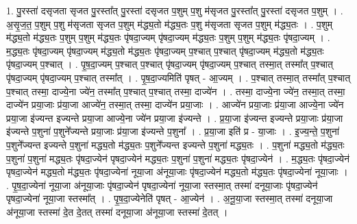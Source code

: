 \documentclass[17pt]{extarticle}
\begin{document}
1. पु॒रस्ता॑ दसृजता सृजत पु॒रस्ता᳚त् पु॒रस्ता॑ दसृजत प॒शुम् प॒शु म॑सृजत पु॒रस्ता᳚त् पु॒रस्ता॑ दसृजत प॒शुम् । . अ॒सृ॒ज॒त॒ प॒शुम् प॒शु म॑सृजता सृजत प॒शुम् म॑द्ध्य॒तो म॑द्ध्य॒तः प॒शु म॑सृजता सृजत प॒शुम् म॑द्ध्य॒तः । . प॒शुम् म॑द्ध्य॒तो म॑द्ध्य॒तः प॒शुम् प॒शुम् म॑द्ध्य॒तः पृ॑षदा॒ज्यम् पृ॑षदा॒ज्यम् म॑द्ध्य॒तः प॒शुम् प॒शुम् म॑द्ध्य॒तः पृ॑षदा॒ज्यम् । . म॒द्ध्य॒तः पृ॑षदा॒ज्यम् पृ॑षदा॒ज्यम् म॑द्ध्य॒तो म॑द्ध्य॒तः पृ॑षदा॒ज्यम् प॒श्चात् प॒श्चात् पृ॑षदा॒ज्यम् म॑द्ध्य॒तो म॑द्ध्य॒तः पृ॑षदा॒ज्यम् प॒श्चात् । . पृ॒ष॒दा॒ज्यम् प॒श्चात् प॒श्चात् पृ॑षदा॒ज्यम् पृ॑षदा॒ज्यम् प॒श्चात् तस्मा॒त् तस्मा᳚त् प॒श्चात् पृ॑षदा॒ज्यम् पृ॑षदा॒ज्यम् प॒श्चात् तस्मा᳚त् । . पृ॒ष॒दा॒ज्यमिति॑ पृषत् - आ॒ज्यम् । . प॒श्चात् तस्मा॒त् तस्मा᳚त् प॒श्चात् प॒श्चात् तस्मा॒ दाज्ये॒ना ज्ये॑न॒ तस्मा᳚त् प॒श्चात् प॒श्चात् तस्मा॒ दाज्ये॑न । . तस्मा॒ दाज्ये॒ना ज्ये॑न॒ तस्मा॒त् तस्मा॒ दाज्ये॑न प्रया॒जाः प्र॑या॒जा आज्ये॑न॒ तस्मा॒त् तस्मा॒ दाज्ये॑न प्रया॒जाः । . आज्ये॑न प्रया॒जाः प्र॑या॒जा आज्ये॒ना ज्ये॑न प्रया॒जा इ॑ज्यन्त इज्यन्ते प्रया॒जा आज्ये॒ना ज्ये॑न प्रया॒जा इ॑ज्यन्ते । . प्र॒या॒जा इ॑ज्यन्त इज्यन्ते प्रया॒जाः प्र॑या॒जा इ॑ज्यन्ते प॒शुना॑ प॒शुने᳚ज्यन्ते प्रया॒जाः प्र॑या॒जा इ॑ज्यन्ते प॒शुना᳚ । . प्र॒या॒जा इति॑ प्र - या॒जाः । . इ॒ज्य॒न्ते॒ प॒शुना॑ प॒शुने᳚ज्यन्त इज्यन्ते प॒शुना॑ मद्ध्य॒तो म॑द्ध्य॒तः प॒शुने᳚ज्यन्त इज्यन्ते प॒शुना॑ मद्ध्य॒तः । . प॒शुना॑ मद्ध्य॒तो म॑द्ध्य॒तः प॒शुना॑ प॒शुना॑ मद्ध्य॒तः पृ॑षदा॒ज्येन॑ पृषदा॒ज्येन॑ मद्ध्य॒तः प॒शुना॑ प॒शुना॑ मद्ध्य॒तः पृ॑षदा॒ज्येन॑ । . म॒द्ध्य॒तः पृ॑षदा॒ज्येन॑ पृषदा॒ज्येन॑ मद्ध्य॒तो म॑द्ध्य॒तः पृ॑षदा॒ज्येना॑ नूया॒जा अ॑नूया॒जाः पृ॑षदा॒ज्येन॑ मद्ध्य॒तो म॑द्ध्य॒तः पृ॑षदा॒ज्येना॑ नूया॒जाः । . पृ॒ष॒दा॒ज्येना॑ नूया॒जा अ॑नूया॒जाः पृ॑षदा॒ज्येन॑ पृषदा॒ज्येना॑ नूया॒जा स्तस्मा॒त् तस्मा॑ दनूया॒जाः पृ॑षदा॒ज्येन॑ पृषदा॒ज्येना॑ नूया॒जा स्तस्मा᳚त् । . पृ॒ष॒दा॒ज्येनेति॑ पृषत् - आ॒ज्येन॑ । . अ॒नू॒या॒जा स्तस्मा॒त् तस्मा॑ दनूया॒जा अ॑नूया॒जा स्तस्मा॑ दे॒त दे॒तत् तस्मा॑ दनूया॒जा अ॑नूया॒जा स्तस्मा॑ दे॒तत् । \newline
\end{document}
